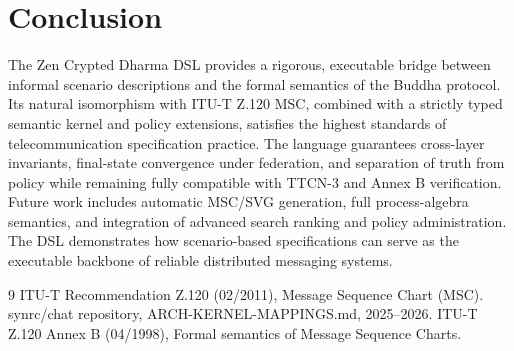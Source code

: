 \documentclass{article}
\begin{document}
\section*{Conclusion}
The Zen Crypted Dharma DSL provides a rigorous, executable bridge between informal scenario descriptions and the formal semantics of the Buddha protocol. Its natural isomorphism with ITU-T Z.120 MSC, combined with a strictly typed semantic kernel and policy extensions, satisfies the highest standards of telecommunication specification practice. The language guarantees cross-layer invariants, final-state convergence under federation, and separation of truth from policy while remaining fully compatible with TTCN-3 and Annex B verification. Future work includes automatic MSC/SVG generation, full process-algebra semantics, and integration of advanced search ranking and policy administration. The DSL demonstrates how scenario-based specifications can serve as the executable backbone of reliable distributed messaging systems.



\begin{thebibliography}{9}
 ITU-T Recommendation Z.120 (02/2011), Message Sequence Chart (MSC).
 synrc/chat repository, ARCH-KERNEL-MAPPINGS.md, 2025--2026.
 ITU-T Z.120 Annex B (04/1998), Formal semantics of Message Sequence Charts.
\end{thebibliography}
\end{document}
